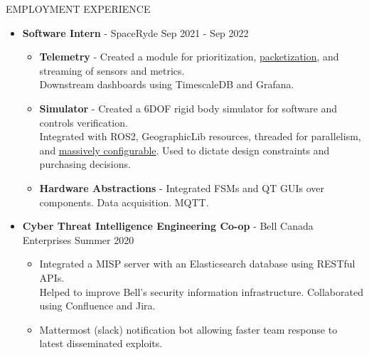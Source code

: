 \documentclass{resume} %
\begin{document}
\begin{rSection}{EMPLOYMENT EXPERIENCE}
    \begin{itemize}
        \item {\bf Software Intern} - SpaceRyde \hfill {Sep 2021 - Sep 2022}
        \begin{itemize}[topsep=-10pt]
            \setlength\itemsep{-0.35em}
            \item[\textbullet] {\bf Telemetry} - Created a module for prioritization, \href{http://libtins.github.io/}{packetization}, and streaming of sensors and metrics.\\
            Downstream dashboards using TimescaleDB and Grafana.
            \item[\textbullet] {\bf Simulator} - Created a 6DOF rigid body simulator for software and controls verification.\\
            Integrated with ROS2, GeographicLib resources, threaded for parallelism, and \href{https://github.com/jbeder/yaml-cpp}{massively configurable}.
            Used to dictate design constraints and purchasing decisions.
            \item[\textbullet] {\bf Hardware Abstractions} - Integrated FSMs and QT GUIs over components. Data acquisition. MQTT.
        \end{itemize}
        \item {\bf Cyber Threat Intelligence Engineering Co-op} - Bell Canada Enterprises \hfill {Summer 2020}
        \begin{itemize}[topsep=-10pt]
            \setlength\itemsep{-0.35em}
            \item[\textbullet] Integrated a MISP server with an Elasticsearch database using RESTful APIs.\\
            Helped to improve Bell's security information infrastructure. Collaborated using Confluence and Jira.
            \item[\textbullet] Mattermost (slack) notification bot allowing faster team response to latest disseminated exploits.
        \end{itemize}
    \end{itemize}
\end{rSection}
\end{document}
